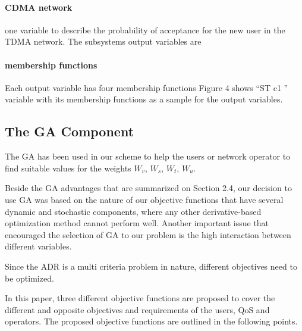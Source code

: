 \paragraph{CDMA network}
one variable to describe the probability of acceptance for the new user in the TDMA network.
The subsystems output variables are 
\paragraph*{membership functions}
Each output variable has four membership functions 
Figure 4 shows “ST c1 ” variable with its membership functions as a sample for the output variables.

\subsection{The GA Component}

The GA has been used in our scheme to help the users or network operator to find suitable values for the weights {$W_{v}$,
	$W_{s}$,
	$W_{t}$,
	$W_{u}$}.


Beside the GA advantages that are summarized on Section 2.4,
	our decision to use GA was based on the nature of our objective functions that have several dynamic and stochastic components,
	where any other derivative-based optimization method cannot perform well.
Another important issue that encouraged the selection of GA to our problem is the high interaction between different variables.

Since the \ac{ADR} is a multi criteria problem in nature,
	different objectives need to be optimized.

In this paper,
	three different objective functions are proposed to cover the different and opposite objectives and requirements of the users,
	QoS and operators.
The proposed objective functions are outlined in the following points.


